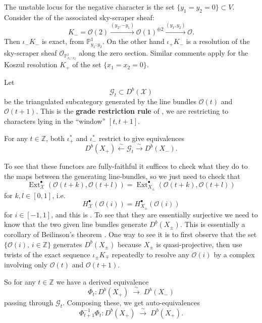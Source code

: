 \documentclass[12pt]{article}
\begin{document}
The unstable locus for the negative character is the set
$\{y_1 = y_2 = 0\} \subset V$. Consider the  of the associated sky-scraper sheaf:
\[
K_{-} = \mathcal{O}(2) \xrightarrow{(y_2,-y_1)} \mathcal{O}(1)^{\oplus 2} 
\xrightarrow{(y_1,y_2)} \mathcal{O}.
\]
Then $\iota_{-}K_{-}$ is exact,  from 
$\mathbb{P}^1_{y_1:y_2}$. On the other hand $\iota_{+}K_{-}$ is a resolution of the sky-scraper 
sheaf $\mathcal{O}_{\mathbb{P}^1_{x_1:x_2}}$ along the zero section. Similar comments apply for 
the Koszul resolution $K_{+}$ of the set $\{x_1 = x_2 = 0\}$.

Let
\[
\mathcal{G}_t \subset D^b(\mathcal{X})
\]
be the triangulated subcategory generated by the line bundles 
$\mathcal{O}(t)$ and $\mathcal{O}(t+1)$. This is the \textbf{grade restriction rule} of \cite{ref}, 
we are restricting to characters lying in the “window” $[t,t+1]$.

\begin{claim}
For any $t \in \mathbb{Z}$, both $\iota_+^*$ and $\iota_-^*$ restrict to give equivalences
\[
D^b(X_+) \xleftarrow{\sim} \mathcal{G}_t \xrightarrow{\sim} D^b(X_-).
\]
\end{claim}

To see that these functors are fully-faithful it suffices to check what they do to the maps 
between the generating line-bundles, so we just need to check that
\[
\operatorname{Ext}^\bullet_{\mathcal{X}}(\mathcal{O}(t+k),\mathcal{O}(t+l))
= \operatorname{Ext}^\bullet_{X_\pm}(\mathcal{O}(t+k),\mathcal{O}(t+l))
\]
for $k,l \in [0,1]$, i.e.
\[
H^\bullet_{\mathcal{X}}(\mathcal{O}(i)) = H^\bullet_{X_\pm}(\mathcal{O}(i))
\]
for $i \in [-1,1]$, and this is . To see that they are essentially surjective we need 
to know that the two given line bundles generate $D^b(X_\pm)$. This is essentially a corollary of Beilinson's theorem \cite{beilinson}. One way to see it is to first observe that the set $\{\mathcal{O}(i),\, i\in \mathbb{Z}\}$ generates $D^b(X_\pm)$ because $X_\pm$ is quasi-projective, 
then use twists of the exact sequence $\iota_\pm K_\mp$ repeatedly to resolve any $\mathcal{O}(i)$ 
by a complex involving only $\mathcal{O}(t)$ and $\mathcal{O}(t+1)$.

So for any $t\in\mathbb{Z}$ we have a derived equivalence
\[
\Phi_t : D^b(X_+) \;\xrightarrow{\ \sim\ }\; D^b(X_-)
\]
passing through $\mathcal{G}_t$. Composing these, we get auto-equivalences
\[
\Phi_{t+1}^{-1}\Phi_t : D^b(X_+) \;\xrightarrow{\ \sim\ }\; D^b(X_+).
\]
\end{document}
